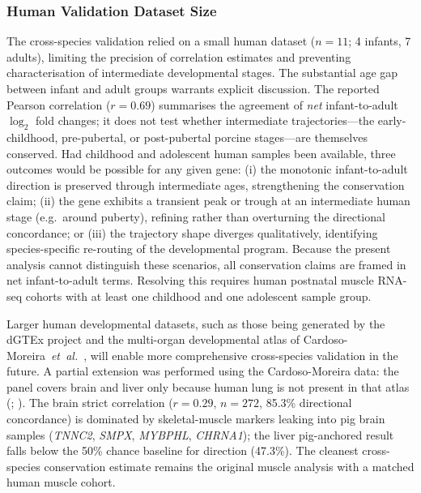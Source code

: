 \subsubsection{Human Validation Dataset Size}

The cross-species validation relied on a small human dataset ($n = 11$; 4 infants, 7 adults), limiting the precision of correlation estimates and preventing characterisation of intermediate developmental stages. The substantial age gap between infant and adult groups warrants explicit discussion. The reported Pearson correlation ($r = 0.69$) summarises the agreement of \emph{net} infant-to-adult $\log_2$ fold changes; it does not test whether intermediate trajectories---the early-childhood, pre-pubertal, or post-pubertal porcine stages---are themselves conserved. Had childhood and adolescent human samples been available, three outcomes would be possible for any given gene: (i) the monotonic infant-to-adult direction is preserved through intermediate ages, strengthening the conservation claim; (ii) the gene exhibits a transient peak or trough at an intermediate human stage (e.g.\ around puberty), refining rather than overturning the directional concordance; or (iii) the trajectory shape diverges qualitatively, identifying species-specific re-routing of the developmental program. Because the present analysis cannot distinguish these scenarios, all conservation claims are framed in net infant-to-adult terms. Resolving this requires human postnatal muscle RNA-seq cohorts with at least one childhood and one adolescent sample group.

Larger human developmental datasets, such as those being generated by the dGTEx project \parencite{coorens_human_2025} and the multi-organ developmental atlas of Cardoso-Moreira~\textit{et~al.}\ \parencite{cardoso-moreira_gene_2019}, will enable more comprehensive cross-species validation in the future. A partial extension was performed using the Cardoso-Moreira data: the panel covers brain and liver only because human lung is not present in that atlas (; ). The brain strict correlation ($r = 0.29$, $n = 272$, 85.3\% directional concordance) is dominated by skeletal-muscle markers leaking into pig brain samples (\textit{TNNC2}, \textit{SMPX}, \textit{MYBPHL}, \textit{CHRNA1}); the liver pig-anchored result falls below the 50\% chance baseline for direction (47.3\%). The cleanest cross-species conservation estimate remains the original muscle analysis with a matched human muscle cohort.

